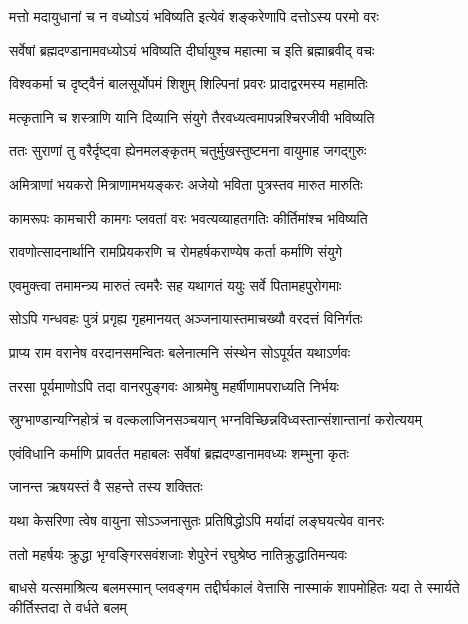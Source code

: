 \twolineshloka
{मत्तो मदायुधानां च न वध्योऽयं भविष्यति}
{इत्येवं शङ्करेणापि दत्तोऽस्य परमो वरः} %

\twolineshloka
{सर्वेषां ब्रह्मदण्डानामवध्योऽयं भविष्यति}
{दीर्घायुश्च महात्मा च इति ब्रह्माब्रवीद् वचः} %

\twolineshloka
{विश्वकर्मा च दृष्ट्वैनं बालसूर्योपमं शिशुम्}
{शिल्पिनां प्रवरः प्रादाद्वरमस्य महामतिः} %

\twolineshloka
{मत्कृतानि च शस्त्राणि यानि दिव्यानि संयुगे}
{तैरवध्यत्वमापन्नश्चिरजीवी भविष्यति} %

\twolineshloka
{ततः सुराणां तु वरैर्दृष्ट्वा ह्येनमलङ्कृतम्}
{चतुर्मुखस्तुष्टमना वायुमाह जगद्गुरुः} %

\twolineshloka
{अमित्राणां भयकरो मित्राणामभयङ्करः}
{अजेयो भविता पुत्रस्तव मारुत मारुतिः} %

\twolineshloka
{कामरूपः कामचारी कामगः प्लवतां वरः}
{भवत्यव्याहतगतिः कीर्तिमांश्च भविष्यति} %

\twolineshloka
{रावणोत्सादनार्थानि रामप्रियकरणि च}
{रोमहर्षकराण्येष कर्ता कर्माणि संयुगे} %

\twolineshloka
{एवमुक्त्वा तमामन्त्र्य मारुतं त्वमरैः सह}
{यथागतं ययुः सर्वे पितामहपुरोगमाः} %

\twolineshloka
{सोऽपि गन्धवहः पुत्रं प्रगृह्य गृहमानयत्}
{अञ्जनायास्तमाचख्यौ वरदत्तं विनिर्गतः} %

\twolineshloka
{प्राप्य राम वरानेष वरदानसमन्वितः}
{बलेनात्मनि संस्थेन सोऽपूर्यत यथाऽर्णवः} %

\twolineshloka
{तरसा पूर्यमाणोऽपि तदा वानरपुङ्गवः}
{आश्रमेषु महर्षीणामपराध्यति निर्भयः} %

\twolineshloka
{स्रुग्भाण्डान्यग्निहोत्रं च वल्कलाजिनसञ्चयान्}
{भग्नविच्छिन्नविध्वस्तान्संशान्तानां करोत्ययम्} %

\twolineshloka
{एवंविधानि कर्माणि प्रावर्तत महाबलः}
{सर्वेषां ब्रह्मदण्डानामवध्यः शम्भुना कृतः} %

\onelineshloka
{जानन्त ऋषयस्तं वै सहन्ते तस्य शक्तितः} %

\twolineshloka
{यथा केसरिणा त्वेष वायुना सोऽञ्जनासुतः}
{प्रतिषिद्धोऽपि मर्यादां लङ्घयत्येव वानरः} %

\twolineshloka
{ततो महर्षयः क्रुद्धा भृग्वङ्गिरसवंशजाः}
{शेपुरेनं रघुश्रेष्ठ नातिक्रुद्धातिमन्यवः} %

\threelineshloka
{बाधसे यत्समाश्रित्य बलमस्मान् प्लवङ्गम}
{तद्दीर्घकालं वेत्तासि नास्माकं शापमोहितः}
{यदा ते स्मार्यते कीर्तिस्तदा ते वर्धते बलम्} %


